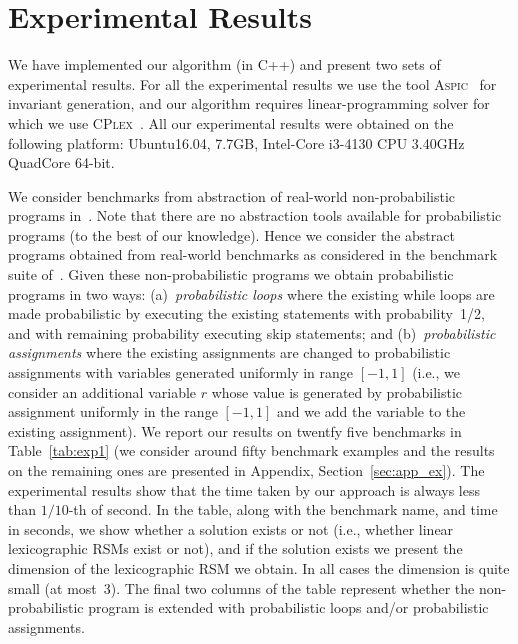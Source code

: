 
\section{Experimental Results}\label{sec:experiments}
We have implemented our algorithm (in C++) and present two sets of experimental results.
For all the experimental results we use the tool \textsc{Aspic}~\cite{FG10:aspic} for 
invariant generation, 
and our algorithm requires linear-programming solver for which we use 
\textsc{CPlex}~\cite{cplex}.
All our experimental results were obtained on the following platform: 
Ubuntu16.04, 7.7GB, Intel-Core i3-4130 CPU 3.40GHz QuadCore 64-bit.


\smallskip{}
We consider benchmarks from abstraction of real-world non-probabilistic programs 
in~\cite{ADFG10:lexicographic}.
Note that there are no abstraction tools available for probabilistic programs 
(to the best of our knowledge). 
Hence we consider the abstract programs obtained from real-world benchmarks as 
considered in the benchmark suite of~\cite{ADFG10:lexicographic}.
Given these non-probabilistic programs we obtain probabilistic programs in two ways:
(a)~{\em probabilistic loops} where the existing while loops are made probabilistic 
by executing the existing statements with probability~1/2, and with remaining 
probability executing skip statements; and
(b)~{\em probabilistic assignments} where the existing assignments are changed to 
probabilistic assignments with variables generated uniformly in range $[-1,1]$ 
(i.e., we consider an additional variable $r$ whose value is generated by 
probabilistic assignment uniformly in the range $[-1,1]$ and we add the variable 
to the existing assignment).
We report our results on twentfy five benchmarks in Table~\ref{tab:exp1} (we 
consider around fifty benchmark examples and the results on the remaining ones 
are presented in Appendix, Section~\ref{sec:app_ex}).
The experimental results show that the time taken by our approach is always less 
than $1/10$-th of second.
In the table, along with the benchmark name, and time in seconds, we show 
whether a solution exists or not (i.e., whether linear lexicographic RSMs exist
or not), and if the solution exists we present the dimension of the lexicographic RSM
we obtain. In all cases the dimension is quite small (at most~3).
The final two columns of the table represent whether the non-probabilistic 
program is extended with probabilistic loops and/or probabilistic assignments.


